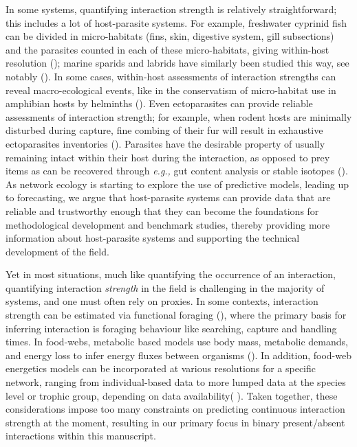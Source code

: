 \begin{refsection}
In some systems, quantifying interaction strength is relatively
straightforward; this includes a lot of host-parasite systems. For
example, freshwater cyprinid fish can be divided in micro-habitats
(fins, skin, digestive system, gill subsections) and the parasites
counted in each of these micro-habitats, giving within-host resolution
(\cite{Simkova2002AbuRel}); marine sparids and labrids have similarly been
studied this way, see notably (\cite{Sasal1999ComStr,
Desdevises2006DetPar, Morand2002InvPat}). In some cases, within-host
assessments of interaction strengths can reveal macro-ecological events,
like in the conservatism of micro-habitat use in amphibian hosts by
helminths (\cite{Badets2011CorEar}). Even ectoparasites can provide
reliable assessments of interaction strength; for example, when rodent
hosts are minimally disturbed during capture, fine combing of their fur
will result in exhaustive ectoparasites inventories
(\cite{Hadfield2014TalTwo, Karbowiak2019ComImm, Matthee2020DivDis,
Sanchez2014PosCoo, Dickinson2020SamSca}). Parasites have the
desirable property of usually remaining intact within their host during
the interaction, as opposed to prey items as can be recovered through
\emph{e.g.,} gut content analysis or stable isotopes
(\cite{Macias-Hernandez2018MolGut, Schmid-Araya2016TroPos}). As network
ecology is starting to explore the use of predictive models, leading up
to forecasting, we argue that host-parasite systems can provide data
that are reliable and trustworthy enough that they can become the
foundations for methodological development and benchmark studies,
thereby providing more information about host-parasite systems and
supporting the technical development of the field.

Yet in most situations, much like quantifying the occurrence of an
interaction, quantifying interaction \emph{strength} in the field is
challenging in the majority of systems, and one must often rely on
proxies. In some contexts, interaction strength can be estimated via
functional foraging (\cite{Portalier2019MecPre}), where the primary basis
for inferring interaction is foraging behaviour like searching, capture
and handling times. In food-webs, metabolic based models use body mass,
metabolic demands, and energy loss to infer energy fluxes between
organisms (\cite{Yodzis1992BodSiz, Berlow2009SimPre}). In addition,
food-web energetics models can be incorporated at various resolutions
for a specific network, ranging from individual-based data to more
lumped data at the species level or trophic group, depending on data
availability( \cite{Barnes2018EneFlu, Berlow2009SimPre}). Taken together,
these considerations impose too many constraints on predicting
continuous interaction strength at the moment, resulting in our primary
focus in binary present/absent interactions within this manuscript.


\end{refsection}
